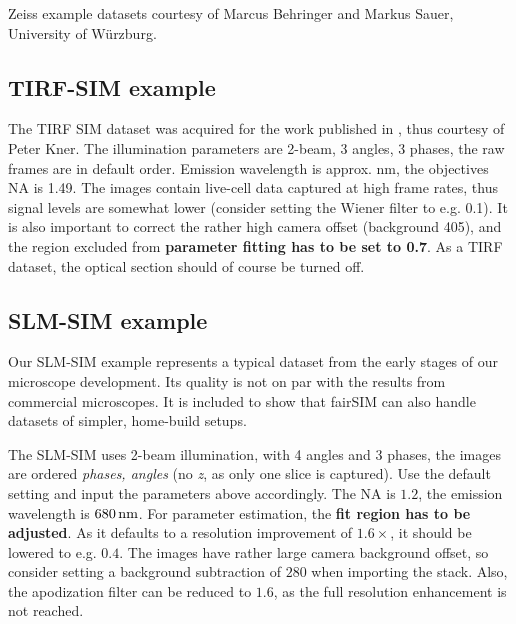\documentclass[twoside=false,
           twocolumn=false,
           a4paper,DIV=15,
           10pt]{scrartcl}
\begin{document}
Zeiss example datasets courtesy of Marcus Behringer and Markus Sauer,
University of Würzburg.

\subsection{TIRF-SIM example}

The TIRF SIM dataset was acquired for the work published in \cite{kner2009super},
thus courtesy of Peter Kner.
The illumination parameters are 2-beam, 3 angles, 3 phases, the raw frames 
are in default order. Emission wavelength is approx. \unit[525]{nm}, the
objectives NA is 1.49. The images contain live-cell data captured at 
high frame rates, thus signal levels are somewhat lower (consider setting 
the Wiener filter to e.g. 0.1). It is also important to correct the 
rather high camera offset (background 405), and the region excluded 
from \textbf{parameter fitting has to be set to 0.7}. As a TIRF dataset,
the optical section should of course be turned off.



\subsection{SLM-SIM example}

Our SLM-SIM example represents a typical dataset from the early stages of our
microscope development. Its quality is not on par with the results
from commercial microscopes. It is included to show that fairSIM can
also handle datasets of simpler, home-build setups.

The SLM-SIM uses 2-beam illumination, with 4 angles and 3 phases, the
images are ordered \emph{phases, angles} (no \emph{z}, as only one slice
is captured). Use the default setting and input the parameters above
accordingly. The NA is $1.2$, the emission wavelength is $\unit[680]{nm}$.
For parameter estimation, the \textbf{fit region has to be adjusted}.
As it defaults to a resolution improvement of $1.6\times$, it should
be lowered to e.g. $0.4$. The images have rather large camera background
offset, so consider setting a background subtraction of $280$ when importing
the stack. Also, the apodization filter can be reduced to $1.6$, as the
full resolution enhancement is not reached.


{\small

}
\end{document}
